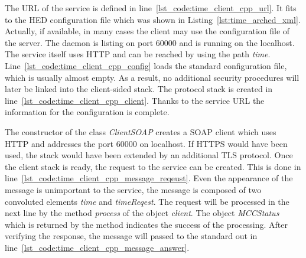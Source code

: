 The URL of the service is defined in line~\ref{lst_code:time_client_cpp_url}.
It fits to the HED configuration file which was shown in Listing~\ref{lst:time_arched_xml}.
Actually, if available, in many cases the client may use the configuration file of the server. 
The daemon is listing on port 60000 and is running on the localhost. The service itself uses HTTP and can be reached by using the path \textit{time}.
Line~\ref{lst_code:time_client_cpp_config} loads the standard configuration file, which is usually almost empty.
As a result, no additional security procedures will later be linked into the client-sided stack. 
The protocol stack is created in line~\ref{lst_code:time_client_cpp_client}. 
Thanks to the service URL the information for the configuration is complete.

The constructor of the class \textit{ClientSOAP} creates a SOAP client which uses HTTP and addresses the port 60000 on localhost.
If HTTPS would have been used, the stack would have been extended by an additional TLS protocol.
Once the client stack is ready, the request to the service can be created.
This is done in line~\ref{lst_code:time_client_cpp_message_reqeust}.
Even the appearance of the message is unimportant to the service, the message is composed of two convoluted elements \textit{time} and \textit{timeReqest}.
%
The request will be processed in the next line by the method \textit{process} of the object \textit{client}.%
The object \textit{MCCStatus} which is returned by the method indicates the success of the processing.
After verifying the response, the message will passed to the standard out in line~\ref{lst_code:time_client_cpp_message_answer}.


